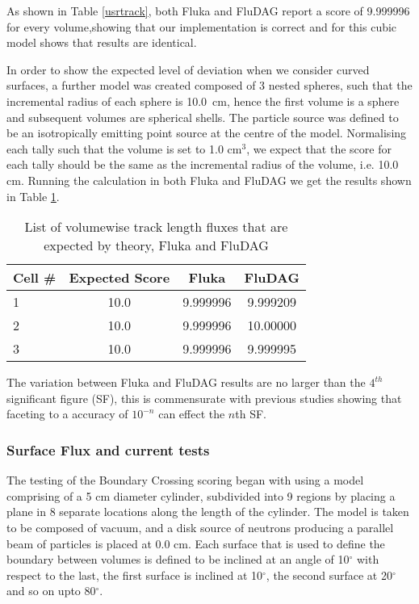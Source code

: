 \documentclass{anstrans}
\begin{document}
As shown in Table \ref{usrtrack}, both Fluka and FluDAG report a score of 
9.999996 for every volume,showing that our implementation is correct and for 
this cubic model shows that results are identical.

In order to show the expected level of deviation when we consider
curved surfaces, a further model was created composed of 3 nested
spheres, such that the incremental radius of each sphere is 10.0\ cm,
hence the first volume is a sphere and subsequent volumes are
spherical shells. The particle source was defined to be an
isotropically emitting point source at the centre of the
model. Normalising each tally such that the volume is set to 1.0 cm$^3$, 
we expect that the score for each tally should be the same as the
incremental radius of the volume, i.e. 10.0 cm. Running the calculation
in both Fluka and FluDAG we get the results shown in Table \ref{usrtrack_comp_sphere}.
\begin{table}[h!]
	\begin{center}
		\begin{tabular}{|l|c|c|c|}
			\hline
			Cell \# & Expected Score & Fluka  & FluDAG \\
			\hline
			1 & 10.0 & 9.999996 & 9.999209 \\
			2 & 10.0 & 9.999996 & 10.00000 \\
			3 & 10.0 & 9.999996 & 9.999995 \\
			\hline
		\end{tabular}
		\caption{List of volumewise track length fluxes that are 
			expected by theory, Fluka and FluDAG}
	\end{center}
\label{usrtrack_comp_sphere}
\end{table}
The variation between Fluka and FluDAG results are no larger than the
$4^{th}$ significant figure (SF), this is commensurate with previous
studies \cite{snouffer_ans} showing that faceting to a accuracy of $10^{-n}$ can
effect the $n$th SF. 

\subsubsection*{Surface Flux and current tests}
The testing of the Boundary Crossing scoring began with using a model
comprising of a 5 cm diameter cylinder, subdivided into 9 regions by
placing a plane in 8 separate locations along the length of the
cylinder. The model is taken to be composed of vacuum, and a disk
source of neutrons producing a parallel beam of particles is placed at
0.0 cm. Each surface that is used to define the boundary between
volumes is defined to be inclined at an angle of 10$^{\circ}$ with respect to the
last, the first surface is inclined at 10$^{\circ}$, the second
surface at 20$^{\circ}$ and so on upto 80$^{\circ}$.
\end{document}
